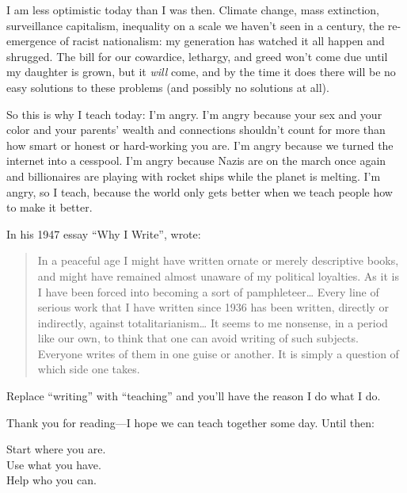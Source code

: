 I am less optimistic today than I was then.
Climate change,
mass extinction,
surveillance capitalism,
inequality on a scale we haven't seen in a century,
the re-emergence of racist nationalism:
my generation has watched it all happen and shrugged.
The bill for our cowardice, lethargy, and greed won't come due until my daughter is grown,
but it \emph{will} come,
and by the time it does there will be no easy solutions to these problems
(and possibly no solutions at all).

So this is why I teach today:
I'm angry.
I'm angry because your sex and your color and your parents' wealth and connections
shouldn't count for more than how smart or honest or hard-working you are.
I'm angry because we turned the internet into a cesspool.
I'm angry because Nazis are on the march once again
and billionaires are playing with rocket ships while the planet is melting.
I'm angry,
so I teach,
because the world only gets better when we teach people how to make it better.

In his 1947 essay ``Why I Write'',
 wrote:

\begin{quote}

  In a peaceful age I might have written ornate or merely descriptive books,
  and might have remained almost unaware of my political loyalties.
  As it is I have been forced into becoming a sort of pamphleteer{\ldots}
  Every line of serious work that I have written since 1936 has been written,
  directly or indirectly,
  against totalitarianism{\ldots}
  It seems to me nonsense,
  in a period like our own,
  to think that one can avoid writing of such subjects.
  Everyone writes of them in one guise or another.
  It is simply a question of which side one takes.

\end{quote}

\noindent
Replace ``writing'' with ``teaching'' and you'll have the reason I do what I do.

\vspace{\baselineskip}

\noindent
Thank you for reading---I hope we can teach together some day.
Until then:

\begin{center}

Start where you are.\\
Use what you have.\\
Help who you can.

\end{center}
